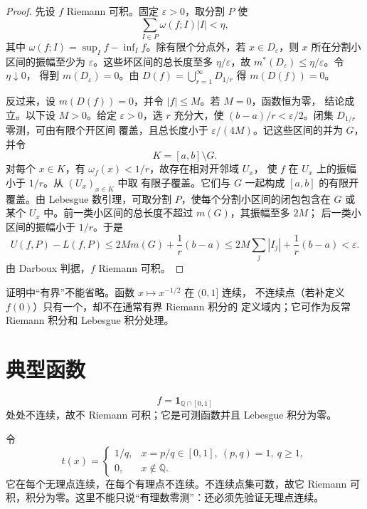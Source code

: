 \begin{proof}
先设 \(f\) Riemann 可积。固定 \(\varepsilon>0\)，取分割 \(P\) 使
\[
 \sum_{I\in P}\omega(f;I)|I|<\eta,
\]
其中 \(\omega(f;I)=\sup_I f-\inf_I f\)。除有限个分点外，若
\(x\in D_\varepsilon\)，则 \(x\) 所在分割小区间的振幅至少为
\(\varepsilon\)。这些坏区间的总长度至多 \(\eta/\varepsilon\)，故
\(m^*(D_\varepsilon)\le\eta/\varepsilon\)。令 \(\eta\downarrow0\)，
得到 \(m(D_\varepsilon)=0\)。由
\(D(f)=\bigcup_{r=1}^{\infty}D_{1/r}\) 得 \(m(D(f))=0\)。

反过来，设 \(m(D(f))=0\)，并令 \(|f|\le M\)。若 \(M=0\)，函数恒为零，
结论成立。以下设 \(M>0\)。给定
\(\varepsilon>0\)，选 \(r\) 充分大，使
\((b-a)/r<\varepsilon/2\)。闭集 \(D_{1/r}\) 零测，可由有限个开区间
覆盖，且总长度小于 \(\varepsilon/(4M)\)。记这些区间的并为 \(G\)，并令
\[
 K=[a,b]\setminus G.
\]
对每个 \(x\in K\)，有 \(\omega_f(x)<1/r\)，故存在相对开邻域 \(U_x\)，
使 \(f\) 在 \(U_x\) 上的振幅小于 \(1/r\)。从 \((U_x)_{x\in K}\) 中取
有限子覆盖。它们与 \(G\) 一起构成 \([a,b]\) 的有限开覆盖。由 Lebesgue
数引理，可取分割 \(P\)，使每个分割小区间的闭包包含在 \(G\) 或某个
\(U_x\) 中。前一类小区间的总长度不超过 \(m(G)\)，其振幅至多 \(2M\)；
后一类小区间的振幅小于 \(1/r\)。于是
\[
 U(f,P)-L(f,P)
 \le 2M m(G)+\frac1r(b-a)
 \le 2M\sum_j|I_j|+\frac1r(b-a)<\varepsilon.
\]
由 Darboux 判据，\(f\) Riemann 可积。
\end{proof}

证明中“有界”不能省略。函数 \(x\mapsto x^{-1/2}\) 在 \((0,1]\) 连续，
不连续点（若补定义 \(f(0)\)）只有一个，却不在通常有界 Riemann 积分的
定义域内；它可作为反常 Riemann 积分和 Lebesgue 积分处理。

\section{典型函数}

\begin{example}[Dirichlet 函数]
\[
 f=\mathbf1_{\mathbb Q\cap[0,1]}
\]
处处不连续，故不 Riemann 可积；它是可测函数并且 Lebesgue 积分为零。
\end{example}

\begin{example}[Thomae 函数]
令
\[
 t(x)=
 \begin{cases}
 1/q,&x=p/q\in[0,1],\ (p,q)=1,\ q\ge1,\\
 0,&x\notin\mathbb Q.
 \end{cases}
\]
它在每个无理点连续，在每个有理点不连续。不连续点集可数，故它 Riemann
可积，积分为零。这里不能只说“有理数零测”：还必须先验证无理点连续。
\end{example}

